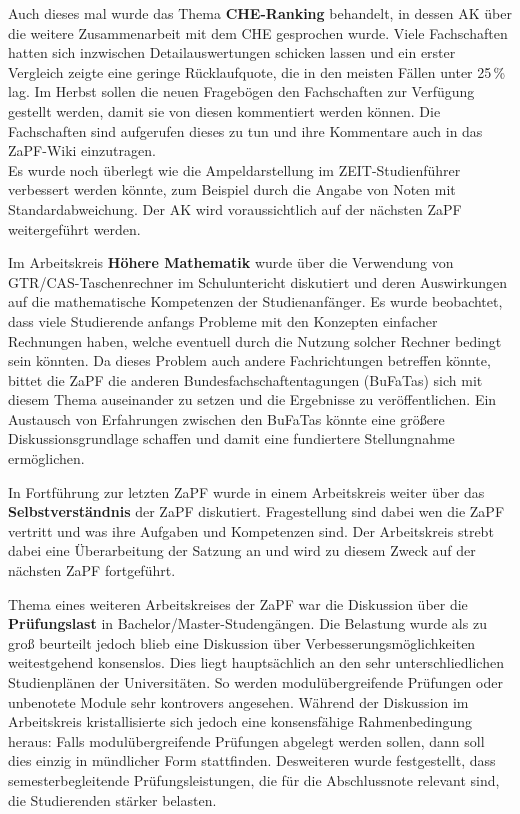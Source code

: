 \documentclass{scrartcl}
\begin{document}
Auch dieses mal wurde das Thema \textbf{CHE-Ranking} behandelt, in dessen AK über die weitere Zusammenarbeit mit dem CHE
gesprochen wurde. Viele Fachschaften hatten sich inzwischen Detailauswertungen schicken lassen und ein erster Vergleich
zeigte
eine geringe Rücklaufquote, die in den meisten Fällen unter 25\,\% lag. Im Herbst sollen die neuen Fragebögen den
Fachschaften zur Verfügung gestellt werden, damit sie von diesen kommentiert werden können. Die Fachschaften sind
aufgerufen dieses zu tun und ihre Kommentare auch in das ZaPF-Wiki einzutragen.\\
Es wurde noch überlegt wie die Ampeldarstellung im ZEIT-Studienführer verbessert werden könnte, zum Beispiel durch die
Angabe von Noten mit Standardabweichung. Der AK wird voraussichtlich auf der nächsten ZaPF weitergeführt werden.

Im Arbeitskreis \textbf{Höhere Mathematik} wurde über die Verwendung von GTR/CAS-Taschen\-rechner im Schuluntericht
diskutiert
und deren Auswirkungen auf die mathematische Kompetenzen der Studienanfänger. Es wurde beobachtet, dass viele
Studierende anfangs Probleme mit den Konzepten einfacher Rechnungen haben, welche eventuell durch die
Nutzung solcher Rechner bedingt sein könnten. Da dieses Problem auch andere Fachrichtungen betreffen könnte, bittet die
ZaPF die anderen Bundesfachschaftentagungen (BuFaTas) sich mit diesem Thema auseinander zu setzen und die Ergebnisse zu
veröffentlichen. Ein Austausch von Erfahrungen zwischen den BuFaTas könnte eine größere Diskussionsgrundlage schaffen
und damit eine fundiertere Stellungnahme ermöglichen.

In Fortführung zur letzten ZaPF wurde in einem Arbeitskreis weiter über das \textbf{Selbstverständnis} der ZaPF
diskutiert. Fragestellung sind dabei wen die ZaPF vertritt und was ihre Aufgaben und Kompetenzen sind. Der Arbeitskreis
strebt dabei eine Überarbeitung der Satzung an und wird zu diesem Zweck auf der nächsten ZaPF fortgeführt.

Thema eines weiteren Arbeitskreises der ZaPF war die Diskussion über die \textbf{Prüfungslast} in
Bachelor/Master-Studengängen. Die Belastung wurde als zu groß beurteilt jedoch blieb eine Diskussion über
Verbesserungsmöglichkeiten weitestgehend konsenslos. Dies liegt hauptsächlich an den sehr
unterschliedlichen Studienplänen der Universitäten. So werden modulübergreifende Prüfungen oder unbenotete
Module sehr kontrovers angesehen. Während der Diskussion im Arbeitskreis kristallisierte sich jedoch eine konsensfähige
Rahmenbedingung heraus: Falls modulübergreifende Prüfungen abgelegt werden sollen, dann soll dies einzig in mündlicher
Form stattfinden. Desweiteren wurde festgestellt, dass semesterbegleitende Prüfungsleistungen, die für die Abschlussnote
relevant sind, die Studierenden stärker belasten. 
\end{document}
